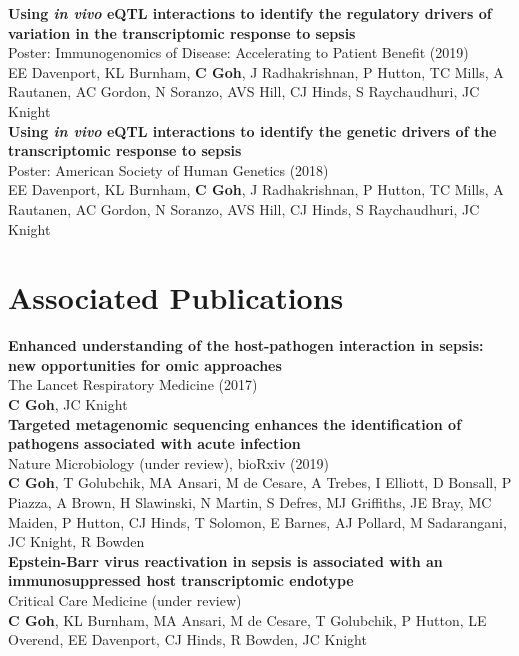 \textbf{Using \textit{in vivo} eQTL interactions to identify the regulatory drivers of variation in the transcriptomic response to sepsis}\\
Poster: Immunogenomics of Disease: Accelerating to Patient Benefit (2019)\\
EE Davenport, KL Burnham, \textbf{C Goh}, J Radhakrishnan, P Hutton, TC Mills, A Rautanen, AC Gordon, N Soranzo, AVS Hill, CJ Hinds, S Raychaudhuri, JC Knight\\

\textbf{Using \textit{in vivo} eQTL interactions to identify the genetic drivers of the transcriptomic response to sepsis}\\
Poster: American Society of Human Genetics (2018)\\
EE Davenport, KL Burnham, \textbf{C Goh}, J Radhakrishnan, P Hutton, TC Mills, A Rautanen, AC Gordon, N Soranzo, AVS Hill, CJ Hinds, S Raychaudhuri, JC Knight\\

\newpage
\chapter*{Associated Publications}
\thispagestyle{plain}

\noindent
\textbf{Enhanced understanding of the host-pathogen interaction in sepsis: new opportunities for omic approaches}\\
The Lancet Respiratory Medicine (2017)\\
\textbf{C Goh}, JC Knight\\

\textbf{Targeted metagenomic sequencing enhances the identification of pathogens associated with acute infection}\\
Nature Microbiology (under review), bioRxiv (2019)\\
\textbf{C Goh}, T Golubchik, MA Ansari, M de Cesare, A Trebes, I Elliott, D Bonsall, P Piazza, A Brown, H Slawinski, N Martin, S Defres, MJ Griffiths, JE Bray, MC Maiden, P Hutton, CJ Hinds, T Solomon, E Barnes, AJ Pollard, M Sadarangani, JC Knight, R Bowden\\

\textbf{Epstein-Barr virus reactivation in sepsis is associated with an immunosuppressed host transcriptomic endotype}\\
Critical Care Medicine (under review)\\
\textbf{C Goh}, KL Burnham, MA Ansari, M de Cesare, T Golubchik, P Hutton, LE Overend, EE Davenport, CJ Hinds, R Bowden, JC Knight\\


